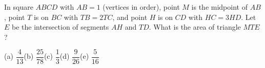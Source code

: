In square $ABCD$ with $AB=1$ (vertices in order), point $M$ is the midpoint of $AB$, point $T$ is on $BC$ with $TB=2TC$, and point $H$ is on $CD$ with $HC=3HD$. Let $E$ be the intersection of segments $AH$ and $TD$. What is the area of triangle $MTE$?

(a) $\dfrac{4}{13}$\quad (b) $\dfrac{25}{78}$\quad (c) $\dfrac{1}{3}$\quad (d) $\dfrac{9}{26}$\quad (e) $\dfrac{5}{16}$
